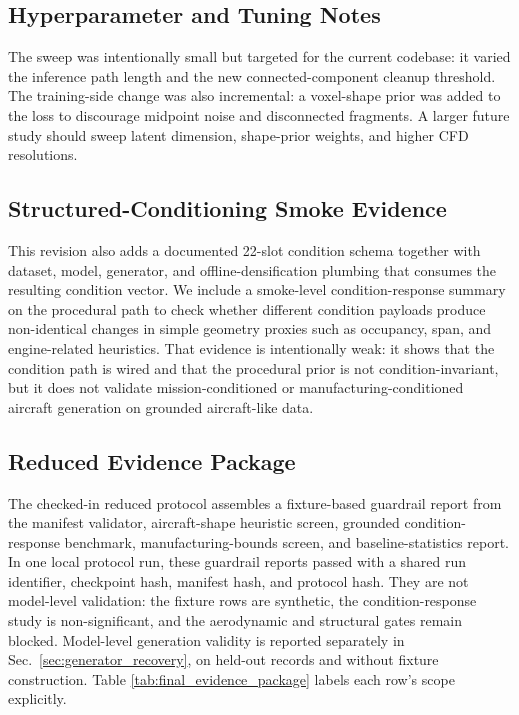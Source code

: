 \subsection{Hyperparameter and Tuning Notes}
The sweep was intentionally small but targeted for the current codebase: it varied the inference path length and the new connected-component cleanup threshold. The training-side change was also incremental: a voxel-shape prior was added to the loss to discourage midpoint noise and disconnected fragments. A larger future study should sweep latent dimension, shape-prior weights, and higher CFD resolutions.

\subsection{Structured-Conditioning Smoke Evidence}
This revision also adds a documented 22-slot condition schema together with dataset, model, generator, and offline-densification plumbing that consumes the resulting condition vector. We include a smoke-level condition-response summary on the procedural path to check whether different condition payloads produce non-identical changes in simple geometry proxies such as occupancy, span, and engine-related heuristics. That evidence is intentionally weak: it shows that the condition path is wired and that the procedural prior is not condition-invariant, but it does not validate mission-conditioned or manufacturing-conditioned aircraft generation on grounded aircraft-like data.

\subsection{Reduced Evidence Package}
The checked-in reduced protocol assembles a fixture-based guardrail report from the manifest validator, aircraft-shape heuristic screen, grounded condition-response benchmark, manufacturing-bounds screen, and baseline-statistics report. In one local protocol run, these guardrail reports passed with a shared run identifier, checkpoint hash, manifest hash, and protocol hash. They are not model-level validation: the fixture rows are synthetic, the condition-response study is non-significant, and the aerodynamic and structural gates remain blocked. Model-level generation validity is reported separately in Sec.~\ref{sec:generator_recovery}, on held-out records and without fixture construction. Table \ref{tab:final_evidence_package} labels each row's scope explicitly.

